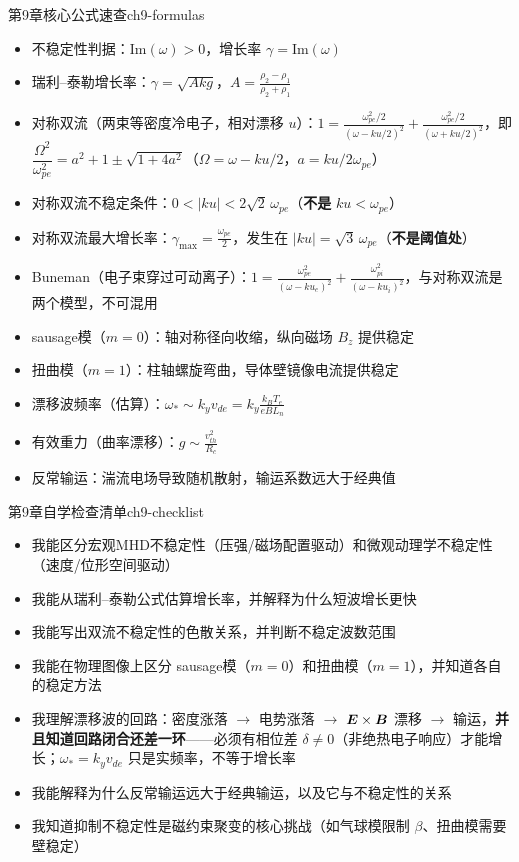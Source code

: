 \begin{formulabox}{第9章核心公式速查}{ch9-formulas}
\begin{itemize}[leftmargin=*,itemsep=0pt]
\item 不稳定性判据：$\text{Im}(\omega) > 0$，增长率 $\gamma = \text{Im}(\omega)$
\item 瑞利--泰勒增长率：$\displaystyle\gamma = \sqrt{A k g}$，$A = \frac{\rho_2 - \rho_1}{\rho_2 + \rho_1}$
\item 对称双流（两束等密度冷电子，相对漂移 $u$）：$\displaystyle 1=\frac{\omega_{pe}^2/2}{(\omega-ku/2)^2}+\frac{\omega_{pe}^2/2}{(\omega+ku/2)^2}$，即 $\dfrac{\Omega^2}{\omega_{pe}^2}=a^2+1\pm\sqrt{1+4a^2}$（$\Omega=\omega-ku/2$，$a=ku/2\omega_{pe}$）
\item 对称双流不稳定条件：$\displaystyle 0<|ku|<2\sqrt2\,\omega_{pe}$（\textbf{不是} $ku<\omega_{pe}$）
\item 对称双流最大增长率：$\displaystyle\gamma_{\max}=\frac{\omega_{pe}}{2}$，发生在 $\displaystyle|ku|=\sqrt3\,\omega_{pe}$（\textbf{不是阈值处}）
\item Buneman（电子束穿过可动离子）：$\displaystyle 1=\frac{\omega_{pe}^2}{(\omega-ku_e)^2}+\frac{\omega_{pi}^2}{(\omega-ku_i)^2}$，与对称双流是两个模型，不可混用
\item  sausage模（$m=0$）：轴对称径向收缩，纵向磁场 $B_z$ 提供稳定
\item 扭曲模（$m=1$）：柱轴螺旋弯曲，导体壁镜像电流提供稳定
\item 漂移波频率（估算）：$\displaystyle\omega_* \sim k_y v_{de} = k_y \frac{k_{\!B}T_e}{eBL_n}$
\item 有效重力（曲率漂移）：$\displaystyle g \sim \frac{v_{th}^2}{R_c}$
\item 反常输运：湍流电场导致随机散射，输运系数远大于经典值
\end{itemize}
\end{formulabox}

\begin{checklistbox}{第9章自学检查清单}{ch9-checklist}
\begin{itemize}[leftmargin=*,label=$\square$]
\item 我能区分宏观MHD不稳定性（压强/磁场配置驱动）和微观动理学不稳定性（速度/位形空间驱动）
\item 我能从瑞利--泰勒公式估算增长率，并解释为什么短波增长更快
\item 我能写出双流不稳定性的色散关系，并判断不稳定波数范围
\item 我能在物理图像上区分 sausage模（$m=0$）和扭曲模（$m=1$），并知道各自的稳定方法
\item 我理解漂移波的回路：密度涨落 $\to$ 电势涨落 $\to$ $\bm{E}\times\bm{B}$ 漂移 $\to$ 输运，\textbf{并且知道回路闭合还差一环}——必须有相位差 $\delta\neq0$（非绝热电子响应）才能增长；$\omega_*=k_yv_{de}$ 只是实频率，不等于增长率
\item 我能解释为什么反常输运远大于经典输运，以及它与不稳定性的关系
\item 我知道抑制不稳定性是磁约束聚变的核心挑战（如气球模限制 $\beta$、扭曲模需要壁稳定）
\end{itemize}
\end{checklistbox}

\endinput
